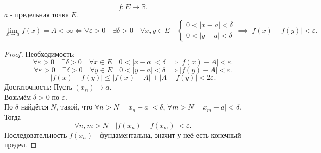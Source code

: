 \documentclass[11pt, oneside]{article}   	%
\begin{document}
    \begin{theorem}
        \[ f: E \mapsto \mathbb{R} .\] 
        $a$ - предельная точка $E$.\\
        \[ \lim\limits_{x \to a} f(x) = A < \infty \iff \forall{\varepsilon>0}\quad \exists{\delta>0}\quad \forall{x,y\in E}\quad  \begin{cases} 0<|x-a|<\delta\\ 0<|y-a|<\delta \end{cases} \implies |f(x)-f(y)| < \varepsilon  .\]
        \begin{proof}
            Необходимость:
            \[ \forall{\varepsilon>0}\quad \exists{\delta > 0}\quad \forall{x\in E}\quad 0<|x-a|<\delta \implies |f(x)-A| < \varepsilon   .\] 
            \[ \forall{\varepsilon>0}\quad \exists{\delta > 0}\quad \forall{y\in E}\quad 0<|y-a|<\delta \implies |f(y)-A| < \varepsilon   .\] 
            \[ |f(x)-f(y)| \le |f(x)-A|+|A-f(y)| < 2\varepsilon .\]
            Достаточность:
            Пусть $(x_n) \to a$.\\
            Возьмём $\delta>0$ по $\varepsilon$.\\
            По $\delta$ найдётся $N$, такой, что $\forall{n>N}\quad |x_n-a|<\delta $, $\forall{m>N}\quad |x_m-a|<\delta $.\\
            Тогда
            \[ \forall{n,m>N}\quad |f(x_n)-f(x_m)|<\varepsilon  .\]
            Последовательность $f(x_n)$ - фундаментальна, значит у неё есть конечный предел.
        \end{proof}
    \end{theorem}
\end{document}
